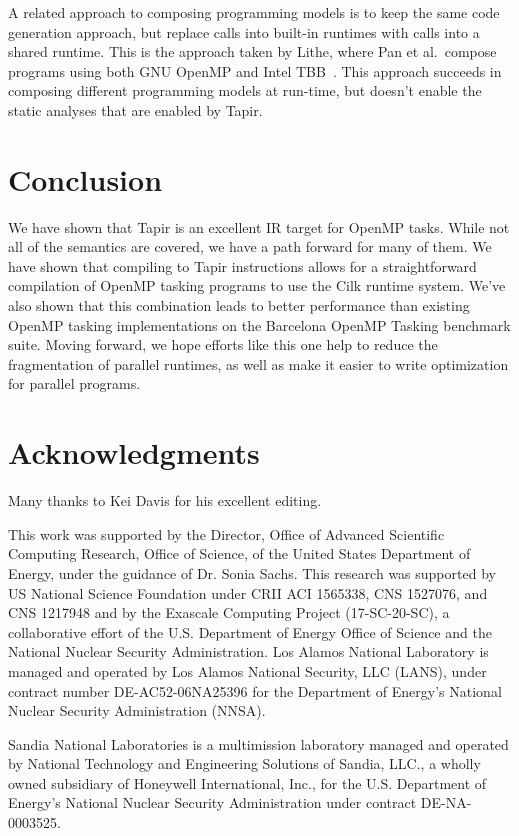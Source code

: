 \documentclass[sigconf]{acmart}
\begin{document}
A related approach to composing programming models is to keep the same code
generation approach, but replace calls into built-in runtimes with calls into a
shared runtime. This is the approach taken by Lithe, where Pan et
al.\ compose programs using both GNU OpenMP and Intel TBB~\cite{lithe}. This approach succeeds
in composing different programming models at run-time, but doesn't enable the
static analyses that are enabled by Tapir.

\section{Conclusion} \label{Sec:Conclusion}
We have shown that Tapir is an excellent IR target for OpenMP tasks. While not
all of the semantics are covered, we have a path forward for many of them. We have
shown that compiling to Tapir instructions allows for a straightforward compilation of 
OpenMP tasking programs to use the Cilk runtime system. We've also shown that this
combination leads to better performance than existing OpenMP tasking implementations
on the Barcelona OpenMP Tasking benchmark suite. Moving forward, we hope efforts like
this one help to reduce the fragmentation of parallel runtimes, as well as make
it easier to write optimization for parallel programs. 

\section*{Acknowledgments}

Many thanks to Kei Davis for his excellent editing.

This work was supported by the Director, Office of Advanced Scientific
Computing Research, Office of Science, of the United States Department
of Energy, under the guidance of Dr. Sonia Sachs. This research was
supported by US National Science Foundation under CRII ACI 1565338,
CNS 1527076, and CNS 1217948 and by the Exascale Computing Project
(17-SC-20-SC), a collaborative effort of the U.S. Department of Energy
Office of Science and the National Nuclear Security Administration.
Los Alamos National Laboratory is managed and operated by Los Alamos
National Security, LLC (LANS), under contract number DE-AC52-06NA25396
for the Department of Energy's National Nuclear Security
Administration (NNSA).

Sandia National Laboratories is a multimission laboratory managed and
operated by National Technology and Engineering Solutions of Sandia,
LLC., a wholly owned subsidiary of Honeywell International, Inc., for
the U.S. Department of Energy's National Nuclear Security
Administration under contract DE-NA-0003525.



\end{document}
